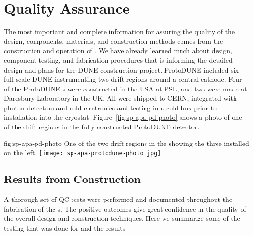 \section{Quality Assurance}
\label{sec:fdsp-apa-qa}



The most important and complete information for assuring the quality of the  design, components, materials, and construction methods comes from the construction and operation of .  We have already learned much about design, component testing, and fabrication procedures that is informing the detailed design and plans for the DUNE  construction project. ProtoDUNE included six full-scale DUNE  instrumenting two drift regions around a central cathode.  Four of the ProtoDUNE s were constructed in the USA at %
PSL, and two were made at Daresbury Laboratory in the UK. All were shipped to CERN, integrated with photon detectors and cold electronics and testing in a cold box prior to installation into the  cryostat.  Figure~\ref{fig:sp-apa-pd-photo} shows a photo of one of the drift regions in the fully constructed ProtoDUNE detector.

\begin{dunefigure}{fig:sp-apa-pd-photo}
{One of the two drift regions in the  showing the three installed  on the left.}
\texttt{[image: sp-apa-protodune-photo.jpg]}
\end{dunefigure}

\subsection{Results from  Construction}
\label{sec:fdsp-apa-qa-protodune-const}

A thorough set of QC tests were performed and documented throughout the fabrication of the  s.  The positive outcomes give great confidence in the quality of the overall  design  and construction techniques.  Here we summarize some of the testing that was done for  and the results.   

